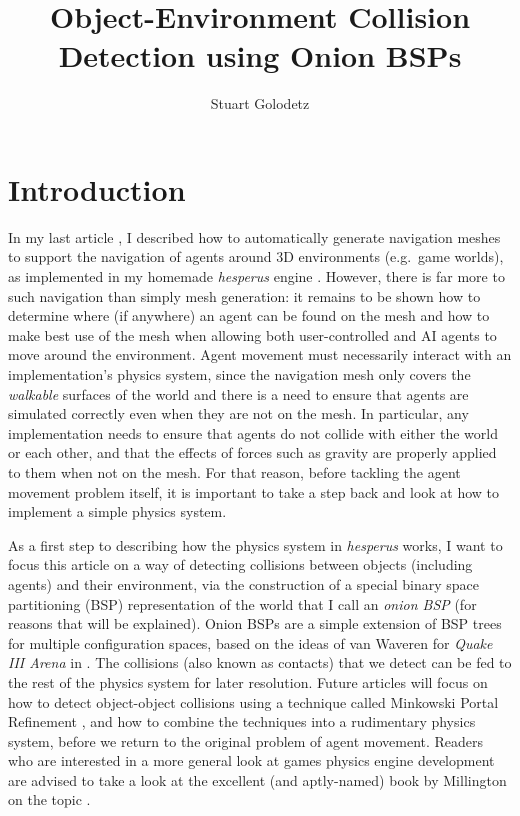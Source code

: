 \documentclass[10pt,twocolumn]{article}
\begin{document}
\title{Object-Environment Collision Detection using Onion BSPs}
\author{Stuart Golodetz}
\date{}
\maketitle

\section{Introduction}

In my last article \cite{golodetzoverload13oct}, I described how to automatically generate navigation meshes to support the navigation of agents around 3D environments (e.g.~game worlds), as implemented in my homemade \emph{hesperus} engine \cite{hesperus}. However, there is far more to such navigation than simply mesh generation: it remains to be shown how to determine where (if anywhere) an agent can be found on the mesh and how to make best use of the mesh when allowing both user-controlled and AI agents to move around the environment. Agent movement must necessarily interact with an implementation's physics system, since the navigation mesh only covers the \emph{walkable} surfaces of the world and there is a need to ensure that agents are simulated correctly even when they are not on the mesh. In particular, any implementation needs to ensure that agents do not collide with either the world or each other, and that the effects of forces such as gravity are properly applied to them when not on the mesh. For that reason, before tackling the agent movement problem itself, it is important to take a step back and look at how to implement a simple physics system.

As a first step to describing how the physics system in \emph{hesperus} works, I want to focus this article on a way of detecting collisions between objects (including agents) and their environment, via the construction of a special binary space partitioning (BSP) representation of the world that I call an \emph{onion BSP} (for reasons that will be explained). Onion BSPs are a simple extension of BSP trees for multiple configuration spaces, based on the ideas of van Waveren for \emph{Quake III Arena} in \cite{vanwaveren01}. The collisions (also known as contacts) that we detect can be fed to the rest of the physics system for later resolution. Future articles will focus on how to detect object-object collisions using a technique called Minkowski Portal Refinement \cite{snethen08}, and how to combine the techniques into a rudimentary physics system, before we return to the original problem of agent movement. Readers who are interested in a more general look at games physics engine development are advised to take a look at the excellent (and aptly-named) book by Millington on the topic \cite{millington07}.
\end{document}
